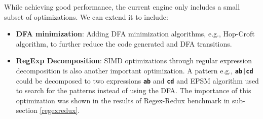While achieving good performance, the current engine only includes a small subset of optimizations. We can  extend it to include:

\begin{itemize}
    \item \textbf{DFA minimization}: Adding DFA minimization algorithms, e.g., Hop-Croft algorithm, to further reduce the code generated and DFA transitions.
    \item \textbf{RegExp Decomposition}: SIMD optimizations through regular expression decomposition is also another important optimization. A pattern e.g., \texttt{\textbf{ab|cd}} could be decomposed to two expressions \texttt{\textbf{ab}} and \texttt{\textbf{cd}} and EPSM algorithm used to search for the patterns instead of using the DFA. The importance of this optimization was shown in the results of Regex-Redux benchmark in sub-section \ref{regexredux}.
\end{itemize}
